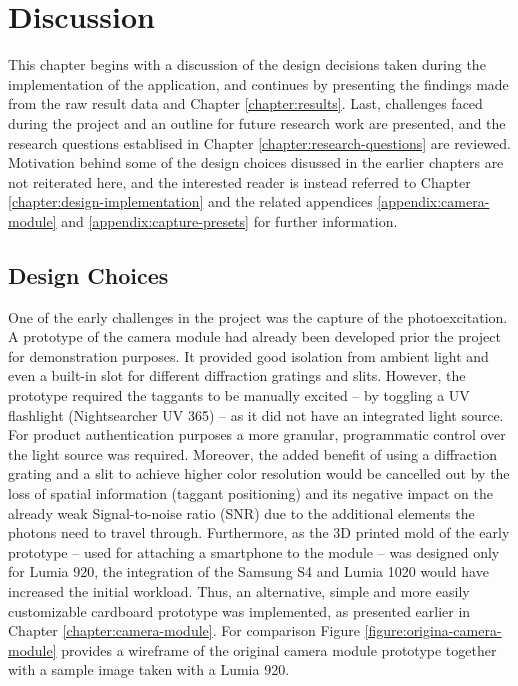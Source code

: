 \documentclass[thesis.tex]{subfiles}
\begin{document}
\chapter{Discussion}
\label{chapter:discussion}

This chapter begins with a discussion of the design decisions taken during the implementation of the application, and continues by presenting the findings made from the raw result data and Chapter \ref{chapter:results}. Last, challenges faced during the project and an outline for future research work are presented, and the research questions establised in Chapter \ref{chapter:research-questions} are reviewed. Motivation behind some of the design choices disussed in the earlier chapters are not reiterated here, and the interested reader is instead referred to Chapter \ref{chapter:design-implementation} and the related appendices \ref{appendix:camera-module} and \ref{appendix:capture-presets} for further information.

\section{Design Choices}

One of the early challenges in the project was the capture of the photoexcitation. A prototype of the camera module had already been developed prior the project for demonstration purposes. It provided good isolation from ambient light and even a built-in slot for different diffraction gratings and slits. However, the prototype required the taggants to be manually excited -- by toggling a UV flashlight (Nightsearcher UV 365) -- as it did not have an integrated light source. For product authentication purposes a more granular, programmatic control over the light source was required. Moreover, the added benefit of using a diffraction grating and a slit to achieve higher color resolution would be cancelled out by the loss of spatial information (taggant positioning) and its negative impact on the already weak Signal-to-noise ratio (SNR) due to the additional elements the photons need to travel through. Furthermore, as the 3D printed mold of the early prototype -- used for attaching a smartphone to the module -- was designed only for Lumia 920, the integration of the Samsung S4 and Lumia 1020 would have increased the initial workload. Thus, an alternative, simple and more easily customizable cardboard prototype was implemented, as presented earlier in Chapter \ref{chapter:camera-module}. For comparison Figure \ref{figure:origina-camera-module} provides a wireframe of the original camera module prototype together with a sample image taken with a Lumia 920.
\end{document}
